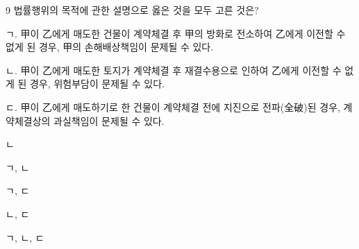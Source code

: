 \begin{question}{9}
법률행위의 목적에 관한 설명으로 옳은 것을 모두 고른 것은?
\begin{framedtext}
ㄱ. 甲이 乙에게 매도한 건물이 계약체결 후 甲의 방화로 전소하여 乙에게 이전할 수 없게 된 경우, 甲의 손해배상책임이 문제될 수 있다. \par
ㄴ. 甲이 乙에게 매도한 토지가 계약체결 후 재결수용으로 인하여 乙에게 이전할 수 없게 된 경우, 위험부담이 문제될 수 있다. \par
ㄷ. 甲이 乙에게 매도하기로 한 건물이 계약체결 전에 지진으로 전파(全破)된 경우, 계약체결상의 과실책임이 문제될 수 있다. \par
\end{framedtext}
\begin{choices}
  \item ㄴ
  \item ㄱ, ㄴ
  \item ㄱ, ㄷ
  \item ㄴ, ㄷ
  \item ㄱ, ㄴ, ㄷ
\end{choices}
\end{question}
